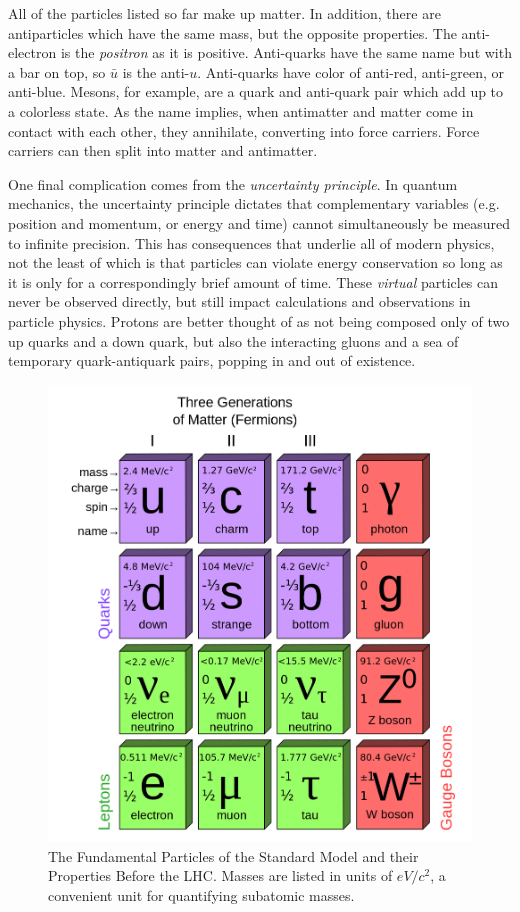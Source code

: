 All of the particles listed so far make up matter. In addition, there are antiparticles which have the same mass, but the opposite properties. The anti-electron is the \textit{positron} as it is positive. Anti-quarks have the same name but with a bar on top, so $\bar{u}$ is the anti-$u$. Anti-quarks have color of anti-red, anti-green, or anti-blue. Mesons, for example, are a quark and anti-quark pair which add up to a colorless state. As the name implies, when antimatter and matter come in contact with each other, they annihilate, converting into force carriers. Force carriers can then split into matter and antimatter.

One final complication comes from the \textit{uncertainty principle}. In quantum mechanics, the uncertainty principle dictates that complementary variables (e.g. position and momentum, or energy and time) cannot simultaneously be measured to infinite precision. This has consequences that underlie all of modern physics, not the least of which is that particles can violate energy conservation so long as it is only for a correspondingly brief amount of time. These \textit{virtual} particles can never be observed directly, but still impact calculations and observations in particle physics. Protons are better thought of as not being composed only of two up quarks and a down quark, but also the interacting gluons and a sea of temporary quark-antiquark pairs, popping in and out of existence.

\begin{figure}[hbt]
\begin{center}
\includegraphics[width=.6\linewidth]{Introduction/figures/fundamentals.png}
\caption[Fundamental Particles of The Standard Model Before the LHC - FIND BETTER SOURCE]{The Fundamental Particles of the Standard Model and their Properties Before the LHC. Masses are listed in units of $eV/c^2$, a convenient unit for quantifying subatomic masses.}
\label{fig:fundamentals}
\end{center}
\end{figure}

